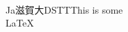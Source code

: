 \documentclass[preview]{standalone}
\newcommand*{\Ja}[1]{%
  \begin{CJK}{UTF8}{ipxg}#1\end{CJK}}
\begin{document}
\centering \\Ja{滋賀大DS}TTThis is some \\LaTeX
\end{document}
